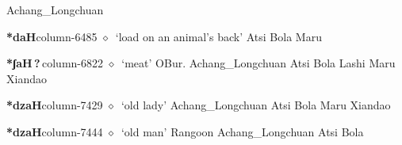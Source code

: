\hspace{1ex}
         Achang\_Longchuan 
  \item {\footnotesize \textbf{*daH}}{\tiny column-6485}
         $\diamond$~`load on an animal's back'
         Atsi 
\hspace{1ex}
         Bola 
\hspace{1ex}
         Maru 
  \item {\footnotesize \textbf{*ʃaH\,?\,}}{\tiny column-6822}
         $\diamond$~`meat'
         OBur. 
\hspace{1ex}
         Achang\_Longchuan 
\hspace{1ex}
         Atsi 
\hspace{1ex}
         Bola 
\hspace{1ex}
         Lashi 
\hspace{1ex}
         Maru 
\hspace{1ex}
         Xiandao 
  \item {\footnotesize \textbf{*dzaH}}{\tiny column-7429}
         $\diamond$~`old lady'
         Achang\_Longchuan 
\hspace{1ex}
         Atsi 
\hspace{1ex}
         Bola 
\hspace{1ex}
         Maru 
\hspace{1ex}
         Xiandao 
  \item {\footnotesize \textbf{*dzaH}}{\tiny column-7444}
         $\diamond$~`old man'
         Rangoon 
\hspace{1ex}
         Achang\_Longchuan 
\hspace{1ex}
         Atsi 
\hspace{1ex}
         Bola 
\hspace{1ex}
